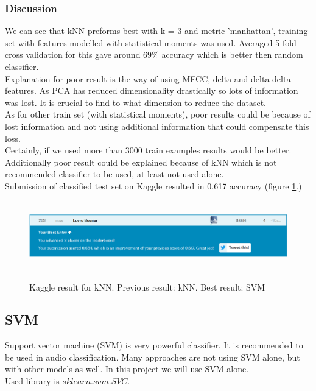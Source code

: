 \documentclass{article}
\begin{document}
\subsubsection{Discussion}
We can see that kNN preforms best with k = 3 and metric 'manhattan', training set with features modelled with statistical moments was used. Averaged 5 fold cross validation for this gave around 69\% accuracy which is better then random classifier. \\
Explanation for poor result is the way of using MFCC, delta and delta delta features. As PCA has reduced dimensionality
drastically so lots of information was lost. It is crucial to find to what dimension to reduce the dataset. \\
As for other train set (with statistical moments), poor results could be because of lost information and not using additional
information that could compensate this loss.\\
Certainly, if we used more than 3000 train examples results would be better.\\
Additionally poor result could be explained because of kNN which is not recommended classifier to be used, at least not used alone.\\
Submission of classified test set on Kaggle resulted in 0.617 accuracy (figure \ref{fig:kaggle}.)\\

\begin{figure}[!htb]
\includegraphics[width=15cm, height=3cm]{kaggle}\\
\caption{Kaggle result for kNN. Previous result: kNN. Best result: SVM}
\label{fig:kaggle}
\centering
\end{figure}


\subsection{SVM}
Support vector machine (SVM) is very powerful classifier. It is recommended to be used in audio classification. Many 
approaches are not using SVM alone, but with other models as well. In this project we will use SVM alone.\\
Used library is $sklearn.svm.SVC$.\\
\end{document}
